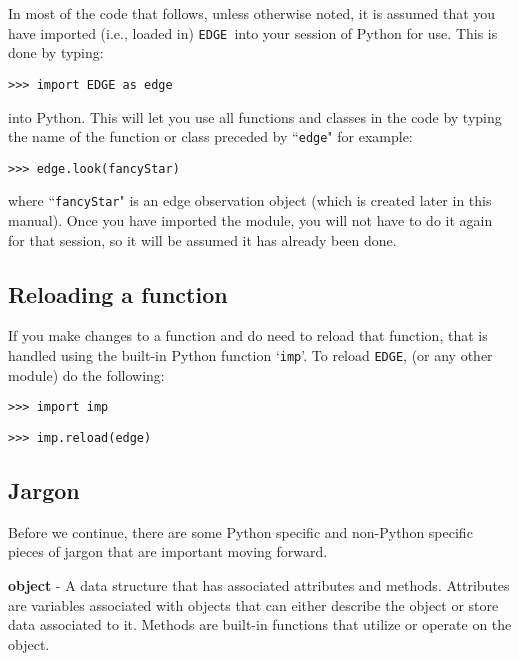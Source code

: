 \documentclass{article}
\newcommand{\edge}{\texttt{EDGE }}
\begin{document}
\noindent In most of the code that follows, unless otherwise noted, it is assumed that you have imported (i.e., loaded in) \edge into your session of Python for use. This is done by typing:

\vspace{2mm}
\texttt{>>> import EDGE as edge}
\vspace{2mm}

\noindent into Python. This will let you use all functions and classes in the code by typing the name of the function or class preceded by ``\texttt{edge}" for example: 

\vspace{2mm} 
\texttt{>>> edge.look(fancyStar)}
\vspace{2mm}

\noindent where ``\texttt{fancyStar}" is an edge observation object (which is created later in this manual). Once you have imported the module, you will not have to do it again for that session, so it will be assumed it has already been done. 


\subsection{Reloading a function}

\noindent If you make changes to a function and do need to reload that function, that is handled using the built-in Python function `\texttt{imp}'. To reload \texttt{EDGE}, (or any other module) do the following:

\vspace{2mm}
\texttt{>>> import imp}

\texttt{>>> imp.reload(edge)}
\vspace{2mm}

\subsection{Jargon}  
 
\noindent Before we continue, there are some Python specific and non-Python specific pieces of jargon that are important moving forward.
 
\vspace{2mm}

\noindent \textbf{object} - A data structure that has associated attributes and methods. Attributes are variables associated with objects that can either describe the object or store data associated to it. Methods are built-in functions that utilize or operate on the object.
 \vspace{2mm}
\end{document}
